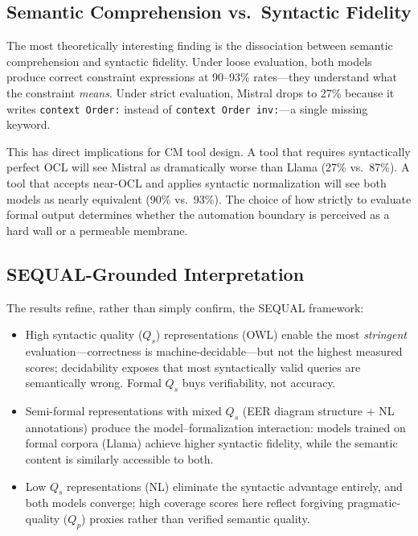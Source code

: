 \documentclass[runningheads]{llncs}
\begin{document}
\subsection{Semantic Comprehension vs.\ Syntactic Fidelity}

The most theoretically interesting finding is the dissociation between semantic comprehension and syntactic fidelity. Under loose evaluation, both models produce correct constraint expressions at 90--93\% rates---they understand what the constraint \emph{means}. Under strict evaluation, Mistral drops to 27\% because it writes \texttt{context~Order:} instead of \texttt{context~Order~inv:}---a single missing keyword.

This has direct implications for CM tool design. A tool that requires syntactically perfect OCL will see Mistral as dramatically worse than Llama (27\% vs.\ 87\%). A tool that accepts near-OCL and applies syntactic normalization will see both models as nearly equivalent (90\% vs.\ 93\%). The choice of how strictly to evaluate formal output determines whether the automation boundary is perceived as a hard wall or a permeable membrane.

\subsection{SEQUAL-Grounded Interpretation}

The results refine, rather than simply confirm, the SEQUAL framework:
\begin{itemize}[noitemsep]
  \item High syntactic quality ($Q_s$) representations (OWL) enable the most \emph{stringent} evaluation---correctness is machine-decidable---but not the highest measured scores; decidability exposes that most syntactically valid queries are semantically wrong. Formal $Q_s$ buys verifiability, not accuracy.
  \item Semi-formal representations with mixed $Q_s$ (EER diagram structure + NL annotations) produce the model--formalization interaction: models trained on formal corpora (Llama) achieve higher syntactic fidelity, while the semantic content is similarly accessible to both.
  \item Low $Q_s$ representations (NL) eliminate the syntactic advantage entirely, and both models converge; high coverage scores here reflect forgiving pragmatic-quality ($Q_p$) proxies rather than verified semantic quality.
\end{itemize}
\end{document}
